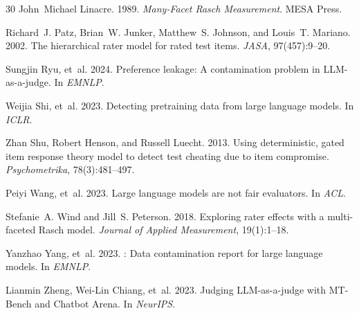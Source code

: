 \documentclass[11pt]{article}
\begin{document}
\begin{thebibliography}{30}
John~Michael Linacre. 1989.
\newblock \emph{Many-Facet Rasch Measurement}.
\newblock MESA Press.

Richard~J. Patz, Brian~W. Junker, Matthew~S. Johnson, and Louis~T. Mariano. 2002.
\newblock The hierarchical rater model for rated test items.
\newblock \emph{JASA}, 97(457):9--20.

Sungjin Ryu, et~al. 2024.
\newblock Preference leakage: A contamination problem in {LLM}-as-a-judge.
\newblock In \emph{EMNLP}.

Weijia Shi, et~al. 2023.
\newblock Detecting pretraining data from large language models.
\newblock In \emph{ICLR}.

Zhan Shu, Robert Henson, and Russell Luecht. 2013.
\newblock Using deterministic, gated item response theory model to detect test cheating due to item compromise.
\newblock \emph{Psychometrika}, 78(3):481--497.

Peiyi Wang, et~al. 2023.
\newblock Large language models are not fair evaluators.
\newblock In \emph{ACL}.

Stefanie~A. Wind and Jill~S. Peterson. 2018.
\newblock Exploring rater effects with a multi-faceted {Rasch} model.
\newblock \emph{Journal of Applied Measurement}, 19(1):1--18.

Yanzhao Yang, et~al. 2023.
: Data contamination report for large language models.
\newblock In \emph{EMNLP}.

Lianmin Zheng, Wei-Lin Chiang, et~al. 2023.
\newblock Judging {LLM}-as-a-judge with {MT-Bench} and {Chatbot Arena}.
\newblock In \emph{NeurIPS}.

\end{thebibliography}
\end{document}
